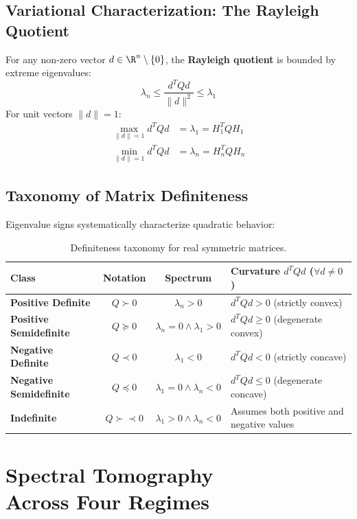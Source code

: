 \subsection{Variational Characterization: The Rayleigh Quotient}
For any non-zero vector $d \in \R^n \setminus \{0\}$, the \textbf{Rayleigh quotient} is bounded by extreme eigenvalues:
\begin{equation}
\lambda_n \le \frac{d^T Q d}{\|d\|^2} \le \lambda_1
\end{equation}
For unit vectors $\|d\| = 1$:
\begin{align}
\max_{\|d\|=1} d^T Q d &= \lambda_1 = H_1^T Q H_1 \\
\min_{\|d\|=1} d^T Q d &= \lambda_n = H_n^T Q H_n
\end{align}

\subsection{Taxonomy of Matrix Definiteness}
Eigenvalue signs systematically characterize quadratic behavior:

\begin{table}[H]
\centering
\small
\renewcommand{\arraystretch}{1.3}
\begin{tabularx}{\textwidth}{l c c X}
\toprule
\textbf{Class} & \textbf{Notation} & \textbf{Spectrum} & \textbf{Curvature $d^T Q d$ ($\forall d \neq 0$)} \\
\midrule
\textbf{Positive Definite} & $Q \succ 0$ & $\lambda_n > 0$ & $d^T Q d > 0$ (strictly convex) \\
\textbf{Positive Semidefinite} & $Q \succeq 0$ & $\lambda_n = 0 \land \lambda_1 > 0$ & $d^T Q d \ge 0$ (degenerate convex) \\
\textbf{Negative Definite} & $Q \prec 0$ & $\lambda_1 < 0$ & $d^T Q d < 0$ (strictly concave) \\
\textbf{Negative Semidefinite} & $Q \preceq 0$ & $\lambda_1 = 0 \land \lambda_n < 0$ & $d^T Q d \le 0$ (degenerate concave) \\
\textbf{Indefinite} & $Q \succ\prec 0$ & $\lambda_1 > 0 \land \lambda_n < 0$ & Assumes both positive and negative values \\
\bottomrule
\end{tabularx}
\caption{Definiteness taxonomy for real symmetric matrices.}
\label{tab:matrix-definiteness-en}
\end{table}


\FloatBarrier
\section[Spectral Tomography Across Four Regimes]{Spectral Tomography\\ Across Four Regimes}
\label{sec:opt-spectral-tomography-four-regimes-en}

